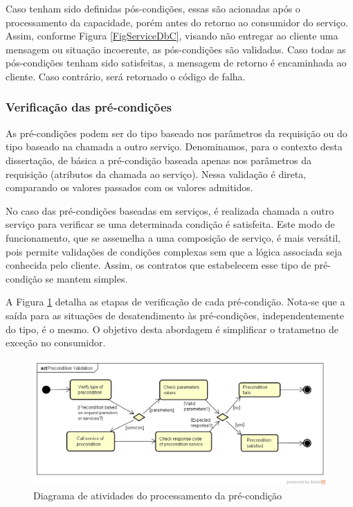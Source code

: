 Caso tenham sido definidas pós-condições, essas são acionadas após o
processamento da capacidade, porém antes do retorno ao consumidor do serviço.
Assim, conforme Figura \ref{FigServiceDbC}, visando não entregar ao cliente uma
mensagem ou situação incoerente, as pós-condições são validadas. Caso todas as
pós-condições tenham sido satisfeitas, a mensagem de retorno é encaminhada ao
cliente. Caso contrário, será retornado o código de falha.


\vspace{-6mm}


\subsubsection{Verificação das pré-condições}
\vspace{-6mm}

As pré-condições podem ser do tipo baseado nos parâmetros da requisição ou do
tipo baseado na chamada a outro serviço. Denominamos, para o contexto desta
dissertação, de básica a pré-condição baseada apenas nos parâmetros da
requisição (atributos da chamada ao serviço). Nessa validação é direta,
comparando os valores passados com os valores admitidos. 

No caso das pré-condições baseadas em serviços, é realizada chamada a outro
serviço para verificar se uma determinada condição é satisfeita. Este modo de
funcionamento, que se assemelha a uma composição de serviço, é mais versátil, pois permite
validações de condições complexas sem que a lógica associada seja conhecida pelo
cliente. Assim, os contratos que estabelecem esse tipo de
pré-condição se mantem simples.

A Figura \ref{FigServicePrecondition} detalha as etapas de verificação de cada
pré-condição. Nota-se que a saída para as situações de desatendimento às
pré-condições, independentemente do tipo, é o mesmo. O objetivo desta abordagem
é simplificar o tratametno de exceção no consumidor.

\begin{figure}[!htb]
\centering
\includegraphics[width=\textwidth,trim = 0mm 5mm 0mm 0mm,clip]{PreconditionValidation.png}
\caption{Diagrama de atividades do processamento da pré-condição}
\label{FigServicePrecondition}
\end{figure}


